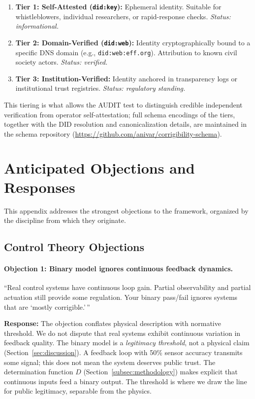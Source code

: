 \documentclass{article}
\begin{document}
\begin{enumerate}
    \item \textbf{Tier 1: Self-Attested (\texttt{did:key}):} Ephemeral identity. Suitable for whistleblowers, individual researchers, or rapid-response checks. \textit{Status: informational.}
    \item \textbf{Tier 2: Domain-Verified (\texttt{did:web}):} Identity cryptographically bound to a specific DNS domain (e.g., \texttt{did:web:eff.org}). Attribution to known civil society actors. \textit{Status: verified.}
    \item \textbf{Tier 3: Institution-Verified:} Identity anchored in transparency logs or institutional trust registries. \textit{Status: regulatory standing.}
\end{enumerate}
This tiering is what allows the AUDIT test to distinguish credible independent verification from operator self-attestation; full schema encodings of the tiers, together with the DID resolution and canonicalization details, are maintained in the schema repository (\url{https://github.com/anivar/corrigibility-schema}).

\section{Anticipated Objections and Responses}
\label{appendix:objections}

This appendix addresses the strongest objections to the framework, organized by the discipline from which they originate.

\subsection{Control Theory Objections}

\paragraph{Objection 1: Binary model ignores continuous feedback dynamics.}
``Real control systems have continuous loop gain. Partial observability and partial actuation still provide some regulation. Your binary pass/fail ignores systems that are `mostly corrigible.'\,''

\textbf{Response:} The objection conflates physical description with normative threshold. We do not dispute that real systems exhibit continuous variation in feedback quality. The binary model is a \textit{legitimacy threshold}, not a physical claim (Section~\ref{sec:discussion}). A feedback loop with 50\% sensor accuracy transmits some signal; this does not mean the system deserves public trust. The determination function $D$ (Section~\ref{subsec:methodology}) makes explicit that continuous inputs feed a binary output. The threshold is where we draw the line for public legitimacy, separable from the physics.
\end{document}
